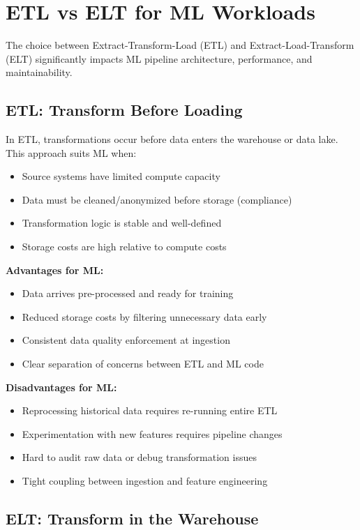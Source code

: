 \section{ETL vs ELT for ML Workloads}

The choice between Extract-Transform-Load (ETL) and Extract-Load-Transform (ELT) significantly impacts ML pipeline architecture, performance, and maintainability.

\subsection{ETL: Transform Before Loading}

In ETL, transformations occur before data enters the warehouse or data lake. This approach suits ML when:
\begin{itemize}
    \item Source systems have limited compute capacity
    \item Data must be cleaned/anonymized before storage (compliance)
    \item Transformation logic is stable and well-defined
    \item Storage costs are high relative to compute costs
\end{itemize}

\textbf{Advantages for ML:}
\begin{itemize}
    \item Data arrives pre-processed and ready for training
    \item Reduced storage costs by filtering unnecessary data early
    \item Consistent data quality enforcement at ingestion
    \item Clear separation of concerns between ETL and ML code
\end{itemize}

\textbf{Disadvantages for ML:}
\begin{itemize}
    \item Reprocessing historical data requires re-running entire ETL
    \item Experimentation with new features requires pipeline changes
    \item Hard to audit raw data or debug transformation issues
    \item Tight coupling between ingestion and feature engineering
\end{itemize}

\subsection{ELT: Transform in the Warehouse}

